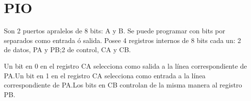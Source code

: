 \section{PIO}

Son 2 puertos apralelos de 8 bits: A y B. Se puede programar con bits por separados como entrada ó salida. Posee 4 registros internos de 8 bits cada un: 2 de datos, PA y PB;\@ 2 de control, CA y CB.\@ 

Un bit en 0 en el registro CA selecciona como salida a la línea correspondiente de PA.\@ Un bit en 1 en el registro CA selecciona como entrada a la línea correspondiente de PA.\@ Los bits en CB controlan de la misma manera al registro PB.\@